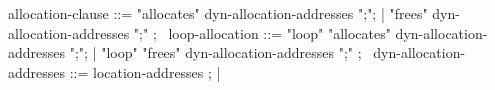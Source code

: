 \begin{syntax}
  allocation-clause ::= "allocates" dyn-allocation-addresses ";";
                      | "frees" dyn-allocation-addresses ";" ;
  \
  loop-allocation ::= "loop" "allocates"  dyn-allocation-addresses ";";
                    | "loop" "frees"  dyn-allocation-addresses ";" ;
  \
  dyn-allocation-addresses ::= location-addresses ;
                       | \nothing
 \end{syntax}
